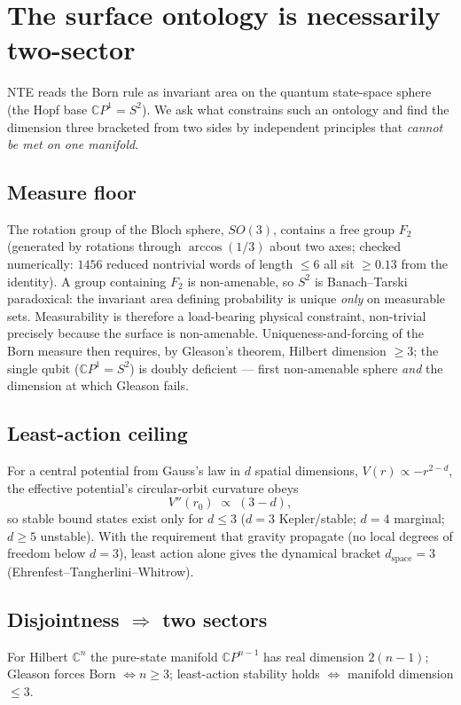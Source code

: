 \documentclass[11pt]{article}
\theoremstyle{definition}
\newcommand{\CC}{\mathbb{C}}
\begin{document}
\section{The surface ontology is necessarily two-sector}\label{sec:twosector}

NTE reads the Born rule as invariant area on the quantum state-space sphere (the Hopf base $\CC P^1=S^2$). We ask what constrains such an ontology and find the dimension three bracketed from two sides by independent principles that \emph{cannot be met on one manifold}.

\subsection{Measure floor}
The rotation group of the Bloch sphere, $SO(3)$, contains a free group $F_2$ (generated by rotations through $\arccos(1/3)$ about two axes; checked numerically: $1456$ reduced nontrivial words of length $\leq 6$ all sit $\geq 0.13$ from the identity). A group containing $F_2$ is non-amenable, so $S^2$ is Banach--Tarski paradoxical: the invariant area defining probability is unique \emph{only} on measurable sets. Measurability is therefore a load-bearing physical constraint, non-trivial precisely because the surface is non-amenable. Uniqueness-and-forcing of the Born measure then requires, by Gleason's theorem, Hilbert dimension $\geq 3$; the single qubit ($\CC P^1=S^2$) is doubly deficient --- first non-amenable sphere \emph{and} the dimension at which Gleason fails.

\subsection{Least-action ceiling}
For a central potential from Gauss's law in $d$ spatial dimensions, $V(r)\propto -r^{2-d}$, the effective potential's circular-orbit curvature obeys
\begin{equation}
V''(r_0)\;\propto\;(3-d),
\end{equation}
so stable bound states exist only for $d\leq 3$ ($d=3$ Kepler/stable; $d=4$ marginal; $d\geq5$ unstable). With the requirement that gravity propagate (no local degrees of freedom below $d=3$), least action alone gives the dynamical bracket $d_{\text{space}}=3$ (Ehrenfest--Tangherlini--Whitrow).

\subsection{Disjointness $\Rightarrow$ two sectors}
For Hilbert $\CC^n$ the pure-state manifold $\CC P^{n-1}$ has real dimension $2(n-1)$; Gleason forces Born $\iff n\geq3$; least-action stability holds $\iff$ manifold dimension $\leq3$.
\end{document}
